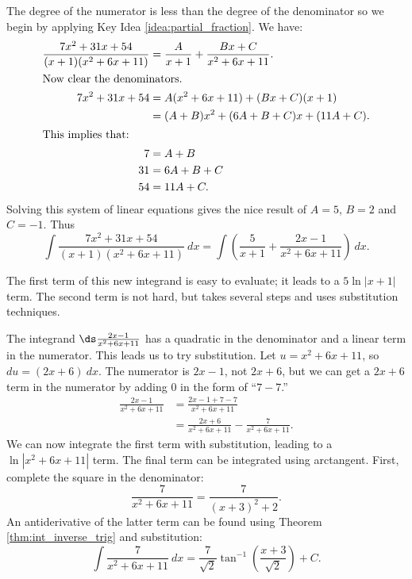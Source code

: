 {The degree of the numerator is less than the degree of the denominator so we begin by applying Key Idea \ref{idea:partial_fraction}. We have:
\begin{align*}
\frac{7x^2+31x+54}{(x+1)(x^2+6x+11)} &= \frac{A}{x+1} + \frac{Bx+C}{x^2+6x+11}. \\
\intertext{Now clear the denominators.}
7x^2+31x+54 &= A(x^2+6x+11) + (Bx+C)(x+1)\\
					&= (A+B)x^2 + (6A+B+C)x + (11A+C).\\
\intertext{This implies that:}
				7&=A+B\\
				31 &= 6A+B+C\\
				54 &= 11A+C.
\end{align*}
Solving this system of linear equations gives the nice result of $A=5$, $B = 2$ and $C=-1$. Thus
\[
\int\frac{7x^2+31x+54}{(x+1)(x^2+6x+11)}\ dx = \int\left(\frac{5}{x+1} + \frac{2x-1}{x^2+6x+11}\right)\ dx.
\]

The first term of this new integrand is easy to evaluate; it leads to a $5\ln|x+1|$ term. The second term is not hard, but takes several steps and uses substitution techniques.

The integrand $\ds \frac{2x-1}{x^2+6x+11}$ has a quadratic in the denominator and a linear term in the numerator. This leads us to try substitution. Let $u = x^2+6x+11$, so $du = (2x+6)\ dx$. The numerator is $2x-1$, not $2x+6$, but we can get a $2x+6$ term in the numerator by adding 0 in the form of ``$7-7$.''
\begin{align*}
\frac{2x-1}{x^2+6x+11} &= \frac{2x-1+7-7}{x^2+6x+11} \\
					&= \frac{2x+6}{x^2+6x+11} - \frac{7}{x^2+6x+11}.
\end{align*}
We can now integrate the first term with substitution, leading to a $\ln|x^2+6x+11|$ term. The final term can be integrated using arctangent. First, complete the square in the denominator:
\[
\frac{7}{x^2+6x+11} = \frac{7}{(x+3)^2+2}.
\]
An antiderivative of the latter term can be found using Theorem \ref{thm:int_inverse_trig} and substitution:
\[
\int \frac{7}{x^2+6x+11}\ dx = \frac{7}{\sqrt{2}}\tan^{-1}\left(\frac{x+3}{\sqrt{2}}\right)+C.
\]

}
